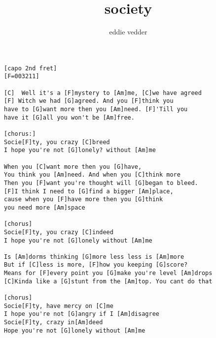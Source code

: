 \author{eddie vedder}
\title{society}
\maketitle
\begin{verbatim}
[capo 2nd fret]
[F=003211]

[C]  Well it's a [F]mystery to [Am]me, [C]we have agreed
[F] Witch we had [G]agreed. And you [F]think you 
have to [G]want more then you [Am]need. [F]'Till you 
have it [G]all you won't be [Am]free.

[chorus:]
Socie[F]ty, you crazy [C]breed
I hope you're not [G]lonely? without [Am]me

When you [C]want more then you [G]have,
You think you [Am]need. And when you [C]think more
Then you [F]want you're thought will [G]began to bleed.
[F]I think I need to [G]find a bigger [Am]place, 
cause when you [F]have more then you [G]think 
you need more [Am]space

[chorus]
Socie[F]ty, you crazy [C]indeed
I hope you're not [G]lonely without [Am]me

Is [Am]dorms thinking [G]more less less is [Am]more
But if [C]less is more, [F]how you keeping [G]score?
Means for [F]every point you [G]make you're level [Am]drops
[C]Kinda like a [G]stunt from the [Am]top. You cant do that

[chorus]
Socie[F]ty, have mercy on [C]me
I hope you're not [G]angry if I [Am]disagree
Socie[F]ty, crazy in[Am]deed
Hope you're not [G]lonely without [Am]me
\end{verbatim}